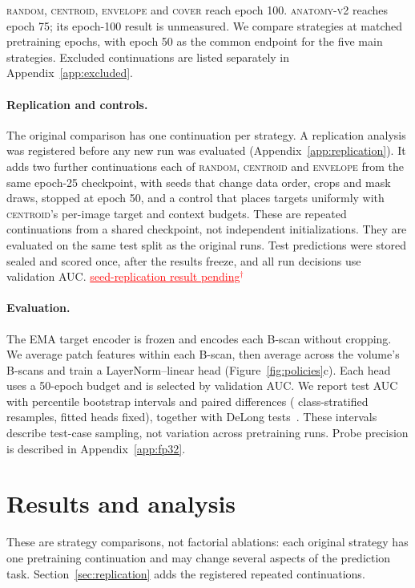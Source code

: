 \documentclass{article}
\newcommand{\ph}[1]{\textcolor{red}{\underline{#1}$^{\dagger}$}}
\newcommand{\CRSeedResultsPending}{\ph{seed-replication result pending}}
\newcommand{\ArmBest}{\textsc{centroid}}
\begin{document}
\textsc{random}, \ArmBest{}, \textsc{envelope} and \textsc{cover} reach
epoch 100. \textsc{anatomy-v2} reaches epoch 75; its epoch-100 result is
unmeasured. We compare
strategies at matched pretraining epochs, with epoch 50 as the common
endpoint for the five main strategies. Excluded continuations are listed
separately in Appendix~\ref{app:excluded}.

\paragraph{Replication and controls.} The original comparison has one
continuation per strategy. A replication analysis was registered before any
new run was evaluated (Appendix~\ref{app:replication}). It adds two further
continuations each of \textsc{random}, \ArmBest{} and \textsc{envelope} from the
same epoch-25 checkpoint, with seeds that change data order, crops and mask
draws, stopped at epoch 50, and a control that places targets uniformly with
\ArmBest{}'s per-image target and context budgets. These are repeated
continuations from a shared checkpoint, not independent initializations. They
are evaluated on the same test split as the original runs. Test predictions were
stored sealed and scored once, after the results freeze, and all run decisions use validation AUC.
\CRSeedResultsPending

\paragraph{Evaluation.} The EMA target encoder is frozen and encodes each B-scan
without cropping. We average patch features within each
B-scan, then average across the volume's B-scans and train a LayerNorm--linear
head (Figure~\ref{fig:policies}c).
Each head uses a 50-epoch budget and is selected by validation AUC.
We report test AUC with percentile bootstrap intervals and paired differences
(\Nboot{} class-stratified resamples, fitted heads fixed), together with
DeLong tests~\citep{delong1988roc}. These intervals describe test-case
sampling, not variation across pretraining runs. Probe precision is
described in Appendix~\ref{app:fp32}.

\section{Results and analysis}
\label{sec:results}

These are strategy comparisons, not factorial ablations: each original strategy
has one pretraining continuation and may change several aspects of the
prediction task. Section~\ref{sec:replication} adds the registered repeated continuations.
\end{document}
